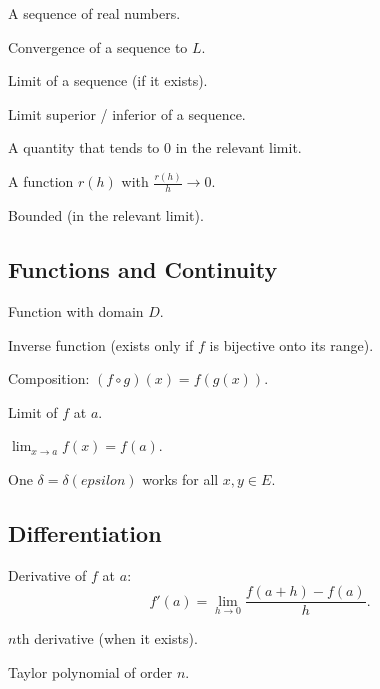 \documentclass[12pt]{article}
\numberwithin{equation}{section}
\def\eps{epsilon}
\newcommand{\RR}{\mathbb{R}}
\newcommand{\eps}{\varepsilon}               %
\theoremstyle{plain}
\theoremstyle{definition}
\theoremstyle{remark}
\begin{document}
\begin{description}[leftmargin=3.2cm,labelsep=0.6cm]
\item[$(a_n)$] A sequence of real numbers.
\item[$a_n\to L$] Convergence of a sequence to $L$.
\item[$\lim_{n\to\infty} a_n$] Limit of a sequence (if it exists).
\item[$\limsup a_n$, $\liminf a_n$] Limit superior / inferior of a sequence.
\item[$o(1)$] A quantity that tends to $0$ in the relevant limit.
\item[$o(h)$ as $h\to 0$] A function $r(h)$ with $\frac{r(h)}{h}\to 0$.
\item[$O(1)$] Bounded (in the relevant limit).
\end{description}

\subsection{Functions and Continuity}

\begin{description}[leftmargin=3.2cm,labelsep=0.6cm]
\item[$f:D\to \RR$] Function with domain $D$.
\item[$f^{-1}$] Inverse function (exists only if $f$ is bijective onto its range).
\item[$f\circ g$] Composition: $(f\circ g)(x)=f(g(x))$.
\item[$\lim_{x\to a} f(x)=L$] Limit of $f$ at $a$.
\item[$f$ continuous at $a$] $\lim_{x\to a}f(x)=f(a)$.
\item[$f$ uniformly continuous on $E$] One $\delta=\delta(\eps)$ works for all $x,y\in E$.
\end{description}

\subsection{Differentiation}

\begin{description}[leftmargin=3.2cm,labelsep=0.6cm]
\item[$f'(a)$] Derivative of $f$ at $a$:
\[
f'(a)=\lim_{h\to 0}\frac{f(a+h)-f(a)}{h}.
\]
\item[$f^{(n)}$] $n$th derivative (when it exists).
\item[$T_n$] Taylor polynomial of order $n$.
\end{description}
\end{document}
